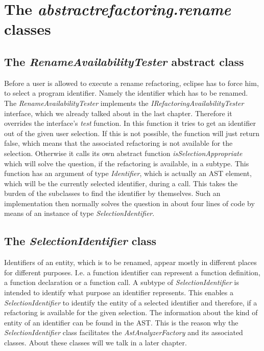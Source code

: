 \documentclass[a4paper,10pt]{report}
\begin{document}
\section{The {\it abstractrefactoring.rename} classes}
\subsection{The {\it RenameAvailabilityTester} abstract class}
Before a user is allowed to execute a rename refactoring, eclipse has to force him, to select a program identifier.
Namely the identifier which has to be renamed.
The {\it RenameAvailabilityTester} implements the {\it IRefactoringAvailabilityTester} interface, which we already talked about in the last chapter.
Therefore it overrides the interface's {\it test} function. In this function it tries to get an identifier out of the given user selection.
If this is not possible, the function will just return false, which means that the associated refactoring is not available for the selection.
Otherwise it calls its own abstract function {\it isSelectionAppropriate} which will solve the question, if the refactoring is available, in a subtype.
This function has an argument of type {\it Identifier}, which is actually an AST element, which will be the currently selected identifier, during a call. 
This takes the burden of the subclasses to find the identifier by themselves.
Such an implementation then normally solves the question in about four lines of code by means of an instance of type {\it SelectionIdentifier}. 

\subsection{The {\it SelectionIdentifier} class}
\label{SelectionIdentifier}
Identifiers of an entity, which is to be renamed, appear mostly in different places for different purposes.
I.e. a function identifier can represent a function definition, a function declaration or a function call. 
A subtype of {\it SelectionIdentifier} is intended to identify what purpose an identifier represents.
This enables a {\it SelectionIdentifier} to identify the entity of a selected identifier and therefore,
if a refactoring is available for the given selection. The information about the kind of entity of an identifier can  be found in the AST. 
This is the reason why the {\it SelectionIdentifier} class facilitates the {\it AstAnalyzerFactory} and its associated classes.
About these classes will we talk in a later chapter.
\end{document}
